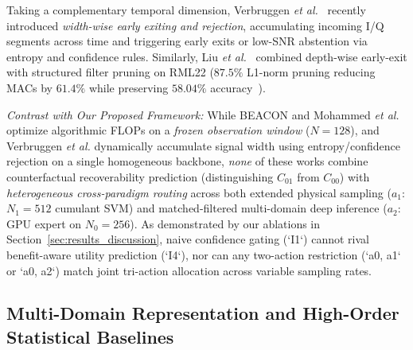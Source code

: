 Taking a complementary temporal dimension, Verbruggen \emph{et al.}~\cite{verbruggen2025width} recently introduced \emph{width-wise early exiting and rejection}, accumulating incoming I/Q segments across time and triggering early exits or low-SNR abstention via entropy and confidence rules. Similarly, Liu \emph{et al.}~\cite{liu2025joint} combined depth-wise early-exit with structured filter pruning on RML22 ($87.5\%$ L1-norm pruning reducing MACs by $61.4\%$ while preserving $58.04\%$ accuracy~\cite[Table~II]{liu2025joint}).

\emph{Contrast with Our Proposed Framework:} While BEACON and Mohammed \emph{et al.} optimize algorithmic FLOPs on a \emph{frozen observation window} ($N=128$), and Verbruggen \emph{et al.} dynamically accumulate signal width using entropy/confidence rejection on a single homogeneous backbone, \emph{none} of these works combine counterfactual recoverability prediction (distinguishing $C_{01}$ from $C_{00}$) with \emph{heterogeneous cross-paradigm routing} across both extended physical sampling ($a_1$: $N_1=512$ cumulant SVM) and matched-filtered multi-domain deep inference ($a_2$: GPU expert on $N_0=256$). As demonstrated by our ablations in Section~\ref{sec:results_discussion}, naive confidence gating (`I1`) cannot rival benefit-aware utility prediction (`I4`), nor can any two-action restriction (`{a0, a1}` or `{a0, a2}`) match joint tri-action allocation across variable sampling rates.

\subsection{Multi-Domain Representation and High-Order Statistical Baselines}
\label{subsec:rel_multidomain_hoc}

